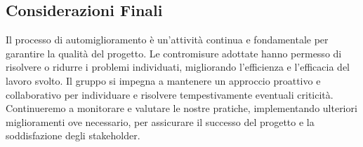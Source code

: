 \documentclass{article}
\begin{document}
\subsection{Considerazioni Finali}
Il processo di automiglioramento è un’attività continua e fondamentale per garantire la qualità del progetto. Le contromisure adottate hanno permesso di risolvere o ridurre i problemi individuati, migliorando l’efficienza e l’efficacia del lavoro svolto. Il gruppo si impegna a mantenere un approccio proattivo e collaborativo per individuare e risolvere tempestivamente eventuali criticità. Continueremo a monitorare e valutare le nostre pratiche, implementando ulteriori miglioramenti ove necessario, per assicurare il successo del progetto e la soddisfazione degli stakeholder.
\end{document}

